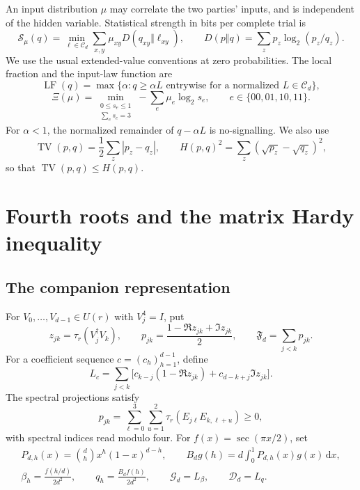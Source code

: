 \documentclass[11pt]{amsart}
\theoremstyle{remark}
\theoremstyle{plain}
\numberwithin{equation}{section}
\DeclareMathOperator{\LF}{LF}
\DeclareMathOperator{\TV}{TV}
\newcommand{\dd}{\,\mathrm d}
\newcommand{\Loc}{\mathcal C}
\newcommand{\Fdef}{\mathfrak F_d}
\newcommand{\Gdef}{\mathcal G_d}
\newcommand{\Ddef}{\mathcal D_d}
\begin{document}
An input distribution \(\mu\) may correlate the two parties' inputs,
and is independent of the hidden variable. Statistical strength in
bits per complete trial is
\begin{equation}\label{eq:strength}
 \mathcal S_\mu(q)=\min_{\ell\in\Loc_d}
       \sum_{x,y}\mu_{xy}D(q_{xy}\Vert\ell_{xy}),\qquad
 D(p\Vert q)=\sum_zp_z\log_2(p_z/q_z).
\end{equation}
We use the usual extended-value conventions at zero probabilities.
The local fraction and the input-law function are
\[
 \LF(q)=\max\{\alpha:q\ge\alpha L
       \text{ entrywise for a normalized }L\in\Loc_d\},
\]
\begin{equation}\label{eq:Xi}
 \Xi(\mu)=
 \min_{\substack{0\le s_e\le1\\\sum_es_e=3}}
       -\sum_e\mu_e\log_2s_e,\qquad e\in\{00,01,10,11\}.
\end{equation}
For \(\alpha<1\), the normalized remainder of \(q-\alpha L\) is
no-signalling. We also use
\[
 \TV(p,q)=\frac12\sum_z|p_z-q_z|,\qquad
 H(p,q)^2=\sum_z(\sqrt{p_z}-\sqrt{q_z})^2,
\]
so that \(\TV(p,q)\le H(p,q)\).

\section{Fourth roots and the matrix Hardy inequality}
\label{sec:reduction}

\subsection{The companion representation}

For \(V_0,\ldots,V_{d-1}\in U(r)\) with \(V_j^4=I\), put
\[
 z_{jk}=\tau_r(V_j^\dagger V_k),\qquad
 p_{jk}=\frac{1-\Re z_{jk}+\Im z_{jk}}2,\qquad
 \Fdef=\sum_{j<k}p_{jk}.
\]
For a coefficient sequence \(c=(c_h)_{h=1}^{d-1}\), define
\begin{equation}\label{eq:Lc}
 L_c=\sum_{j<k}
 \bigl[c_{k-j}(1-\Re z_{jk})+c_{d-k+j}\Im z_{jk}\bigr].
\end{equation}
The spectral projections satisfy
\begin{equation}\label{eq:forbidden}
 p_{jk}=\sum_{\ell=0}^3\sum_{u=1}^2
              \tau_r(E_{j\ell}E_{k,\ell+u})\ge0,
\end{equation}
with spectral indices read modulo four.
For \(f(x)=\sec(\pi x/2)\), set
\[
 \begin{gathered}
 P_{d,h}(x)=\binom dhx^h(1-x)^{d-h},\qquad
 B_dg(h)=d\int_0^1P_{d,h}(x)g(x)\dd x,\\
 \beta_h=\frac{f(h/d)}{2d^2},\qquad
 q_h=\frac{B_df(h)}{2d^2},\qquad
 \Gdef=L_\beta,\qquad \Ddef=L_q.
 \end{gathered}
\]
\end{document}
